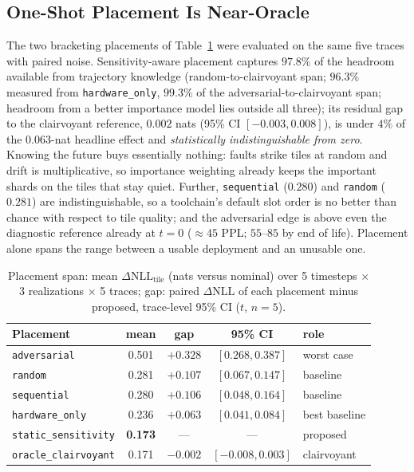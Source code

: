 \documentclass[journal]{IEEEtran}
\newcommand{\policy}[1]{\texttt{#1}}
\newcommand{\dnll}{\Delta\mathrm{NLL}}
\begin{document}
\subsection{One-Shot Placement Is Near-Oracle}
\label{sec:r3}
The two bracketing placements of Table~\ref{tab:bounds} were evaluated
on the same five traces with paired noise.
Sensitivity-aware placement captures $97.8\%$ of the headroom
available from trajectory knowledge (random-to-clairvoyant span;
$96.3\%$ measured from \policy{hardware\_only}, $99.3\%$ of the
adversarial-to-clairvoyant span; headroom from a better importance
model lies outside all three); its residual gap to the clairvoyant
reference, $0.002$ nats (95\% CI $[-0.003, 0.008]$), is
under $4\%$ of the $0.063$-nat headline effect and \emph{statistically
indistinguishable from zero}. Knowing the future buys essentially
nothing: faults strike tiles at random and drift is multiplicative, so
importance weighting already keeps the important shards on the tiles
that stay quiet. Further,
\policy{sequential} ($0.280$) and
\policy{random} ($0.281$) are indistinguishable, so a toolchain's
default slot order is no better than chance with respect to tile
quality; and the adversarial edge is above even the diagnostic
reference already at $t{=}0$ (${\approx}45$ PPL; $55$--$85$ by end of
life).
Placement alone spans the range between a usable deployment and an
unusable one.

\begin{table}[t]
\centering
\caption{Placement span: mean $\dnll_{\mathrm{tile}}$ (nats versus
nominal) over 5 timesteps $\times$ 3 realizations $\times$ 5 traces;
gap: paired $\dnll$ of each placement minus proposed, trace-level
95\% CI ($t$, $n{=}5$).}
\label{tab:bounds}
\footnotesize
\setlength{\tabcolsep}{2pt}
\begin{tabular}{lcccl}
\toprule
Placement & mean & gap & 95\% CI & role \\
\midrule
\policy{adversarial} & 0.501 & $+0.328$ & $[0.268,0.387]$ & worst case \\
\midrule
\policy{random} & 0.281 & $+0.107$ & $[0.067,0.147]$ & baseline \\
\policy{sequential} & 0.280 & $+0.106$ & $[0.048,0.164]$ & baseline \\
\policy{hardware\_only} & 0.236 & $+0.063$ & $[0.041,0.084]$ & best baseline \\
\policy{static\_sensitivity} & \textbf{0.173} & --- & --- & proposed \\
\midrule
\policy{oracle\_clairvoyant} & 0.171 & $-0.002$ & $[-0.008,0.003]$ & clairvoyant \\
\bottomrule
\end{tabular}
\end{table}
\end{document}
